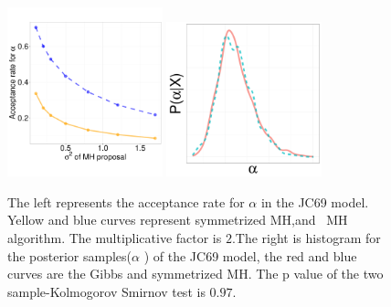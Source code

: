 {\begin{figure}[H]
  \begin{minipage}[!hp]{0.99\linewidth}
  	\centering
    \includegraphics [width=0.40\textwidth, angle=0]{figs/acc/JCalpha_k2.pdf}
	\hspace{.5in}
    \includegraphics [width=0.40\textwidth, angle=0]{figs/JC_ks/jc_hist_44_05_3_.pdf}
  \end{minipage}
    \caption{The left represents the acceptance rate for $\alpha$ in the JC69 model.  Yellow and blue curves represent symmetrized MH,and \naive\ MH  algorithm. The multiplicative factor is $2$.The right is histogram for the posterior samples($\alpha$ ) of the JC69 model, the red and blue curves are the Gibbs and symmetrized MH. The p value of the two sample-Kolmogorov Smirnov test is $ 0.97$.  }
     \label{fig:ACC_JC}
  \end{figure}

}
